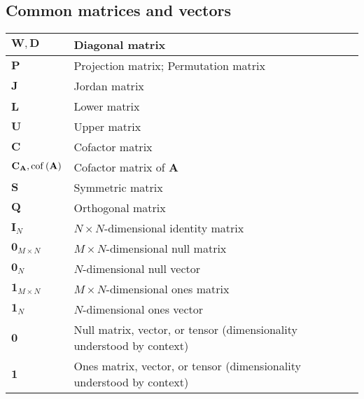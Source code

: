 \documentclass{article}
\begin{document}
\subsection{Common matrices and vectors}
\begin{xltabular}{\textwidth}{XX}
	\(\mathbf{W}, \mathbf{D}\)                  & Diagonal matrix                                                       \\ \hline
	\(\mathbf{P}\)                              & Projection matrix; Permutation matrix                                 \\ \hline
	\(\mathbf{J}\)                              & Jordan matrix                                                         \\ \hline
	\(\mathbf{L}\)                              & Lower matrix                                                          \\ \hline
	\(\mathbf{U}\)                              & Upper matrix                                                          \\ \hline
	\(\mathbf{C}\)                              & Cofactor matrix                                                       \\ \hline
	\(\mathbf{C}_\mathbf{A}, \operatorname{cof}\left(\mathbf{A}\right)\) & Cofactor matrix of \(\mathbf{A}\)                                     \\ \hline
	\(\mathbf{S}\)                              & Symmetric matrix                                                      \\ \hline
	\(\mathbf{Q}\)                              & Orthogonal matrix                                                     \\ \hline
	\(\mathbf{I}_N\)                            & \(N\times N\)-dimensional identity matrix                             \\ \hline
	\(\mathbf{0}_{M\times N}\)                  & \(M\times N\)-dimensional null matrix                                 \\ \hline
	\(\mathbf{0}_{N}\)                          & \(N\)-dimensional null vector                                         \\ \hline
	\(\mathbf{1}_{M\times N}\)                  & \(M\times N\)-dimensional ones matrix                                 \\ \hline
	\(\mathbf{1}_{N}\)                          & \(N\)-dimensional ones vector                                         \\ \hline
	\(\mathbf{0}\)                              & Null matrix, vector, or tensor (dimensionality understood by context) \\ \hline
	\(\mathbf{1}\)                              & Ones matrix, vector, or tensor (dimensionality understood by context) \\
\end{xltabular}
\end{document}
